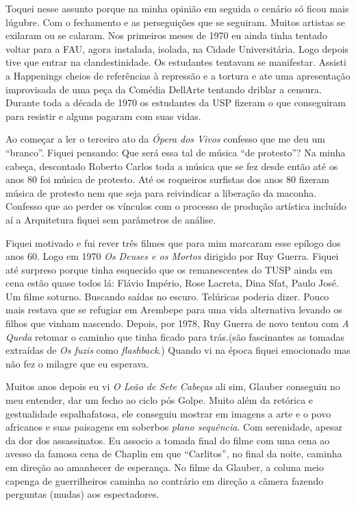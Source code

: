 Toquei nesse assunto porque na minha opinião em seguida o cenário só
ficou mais lúgubre. Com o fechamento e as perseguições que se seguiram.
Muitos artistas se exilaram ou se calaram. Nos primeiros meses de 1970
eu ainda tinha tentado voltar para a FAU, agora instalada, isolada, na
Cidade Universitária. Logo depois tive que entrar na clandestinidade. Os
estudantes tentavam se manifestar. Assisti a Happenings cheios de
referências à repressão e a tortura e ate uma apresentação improvisada
de uma peça da Comédia DellArte tentando driblar a censura. Durante toda
a década de 1970 os estudantes da USP fizeram o que conseguiram para
resistir e alguns pagaram com suas vidas.

Ao começar a ler o terceiro ato da \textit{Ópera dos Vivos} confesso que me
deu um “branco”. Fiquei pensando: Que será essa tal de música “de
protesto”? Na minha cabeça, descontado Roberto Carlos toda a música que
se fez desde então até os anos 80 foi música de protesto. Até os
roqueiros surfistas dos anos 80 fizeram música de protesto nem que seja
para reivindicar a liberação da maconha. Confesso que ao perder os
vínculos com o processo de produção artística incluído aí a Arquitetura
fiquei sem parâmetros de análise.

Fiquei motivado e fui rever três filmes que para mim marcaram esse
epílogo dos anos 60. Logo em 1970 \textit{Os Deuses e os Mortos} dirigido
por Ruy Guerra. Fiquei até surpreso porque tinha esquecido que os
remanescentes do TUSP ainda em cena estão quase todos lá: Flávio
Império, Rose Lacreta, Dina Sfat, Paulo José. Um filme soturno. Buscando
saídas no escuro. Telúricas poderia dizer. Pouco mais restava que se
refugiar em Arembepe para uma vida alternativa levando os filhos que
vinham nascendo. Depois, por 1978, Ruy Guerra de novo tentou com \textit{A
Queda} retomar o caminho que tinha ficado para trás.(são fascinantes as
tomadas extraídas de \textit{Os fuzis} como \textit{flashback}.) Quando vi na
época fiquei emocionado mas não fez o milagre que eu esperava.

Muitos anos depois eu vi \textit{O Leão de Sete Cabeças} ali sim, Glauber
conseguiu no meu entender, dar um fecho ao ciclo pós Golpe. Muito além
da retórica e gestualidade espalhafatosa, ele conseguiu mostrar em
imagens a arte e o povo africanos e suas paisagens em soberbos
\textit{plano sequência}. Com serenidade, apesar da dor dos assassinatos.
Eu associo a tomada final do filme com uma cena ao avesso da famosa cena
de Chaplin em que “Carlitos”, no final da noite, caminha em direção ao
amanhecer de esperança. No filme da Glauber, a coluna meio capenga de
guerrilheiros caminha ao contrário em direção a câmera fazendo perguntas
(mudas) aos espectadores.


